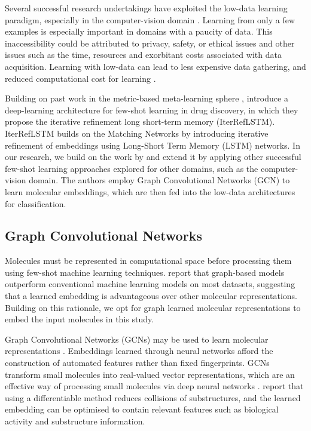 Several successful research undertakings have exploited the low-data learning paradigm, especially in the computer-vision domain \cite{koch2015siamese, vinyals2016matching, snell2017prototypical, sung2018learning}. Learning from only a few examples is especially important in domains with a paucity of data. This inaccessibility could be attributed to privacy, safety, or ethical issues and other issues such as the time, resources and exorbitant costs associated with data acquisition. Learning with low-data can lead to less expensive data gathering, and reduced computational cost for learning \cite{wang2020generalizing}.

Building on past work in the metric-based meta-learning sphere \cite{vinyals2016matching}, \citet{altae2017low} introduce a deep-learning architecture for few-shot learning in drug discovery, in which they propose the iterative refinement long short-term memory (IterRefLSTM). IterRefLSTM builds on the Matching Networks \cite{vinyals2016matching} by introducing iterative refinement of embeddings using Long-Short Term Memory (LSTM) networks. In our research, we build on the work by \citet{altae2017low} and extend it by applying other successful few-shot learning approaches explored for other domains, such as the computer-vision domain. The authors employ Graph Convolutional Networks (GCN) to learn molecular embeddings, which are then fed into the low-data architectures for classification.

\subsection{Graph Convolutional Networks}

Molecules must be represented in computational space before processing them using few-shot machine learning techniques. \citet{wu2018moleculenet} report that graph-based models outperform conventional machine learning models on most datasets, suggesting that a learned embedding is advantageous over other molecular representations. Building on this rationale, we opt for graph learned molecular representations to embed the input molecules in this study. 

Graph Convolutional Networks (GCNs) may be used to learn molecular representations \cite{jiang2021could}. Embeddings learned through neural networks afford the construction of automated features rather than fixed fingerprints. GCNs transform small molecules into real-valued vector representations, which are an effective way of processing small molecules via deep neural networks \cite{gomez2018automatic}. \citet{duvenaud2015convolutional} report that using a differentiable method reduces collisions of substructures, and the learned embedding can be optimised to contain relevant features such as biological activity and substructure information.


